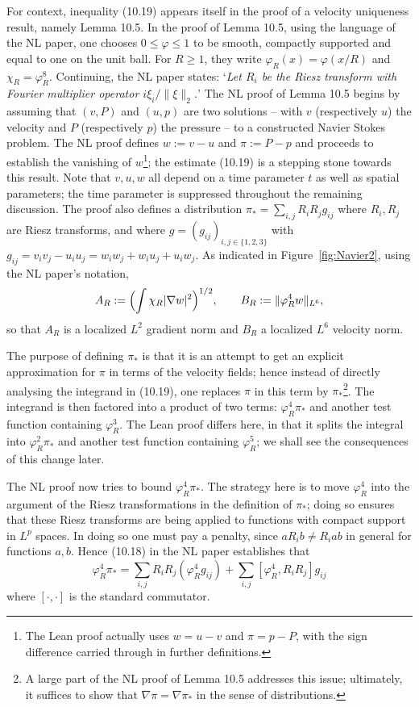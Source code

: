 \documentclass[10pt, a4paper, reqno]{amsart}
\numberwithin{equation}{section}
\renewcommand{\geq}{\geqslant}
\renewcommand{\leq}{\leqslant}
\theoremstyle{definition}
\theoremstyle{definition}
\begin{document}
For context, inequality (10.19) appears itself in the proof of a velocity uniqueness result, namely Lemma 10.5. 
In the proof of Lemma 10.5, using the language of 
the NL paper, one chooses $0 \leq \varphi \leq 1 $ to be smooth,
compactly supported and equal to one on the unit ball. For $R \geq 1$, they write $\varphi_R(x) = \varphi(x/R)$ and
$\chi_R = \varphi^8_R$. Continuing, the NL paper states:  `\emph{Let $R_i$ be the Riesz transform with Fourier multiplier operator $i\xi_i/\|\xi\|_2$.}' 
The NL proof of Lemma 10.5 begins by assuming that $(v,P)$ and $(u,p)$ are two solutions -- with $v$ (respectively $u$) the velocity and $P$ (respectively $p$) the pressure -- to a constructed Navier Stokes problem. The NL proof defines $w := v - u$ and $\pi := P-p$ and proceeds to establish the vanishing of $w$\footnote{The Lean proof actually uses $w = u-v$ and $\pi = p -P$, with the sign difference carried through in further definitions.}; the estimate (10.19) is a stepping stone towards this result. Note that $v,u,w$ all depend on a time parameter $t$ as well as spatial parameters; the time parameter is suppressed throughout the remaining discussion. The proof also defines a distribution $\pi_* = \sum_{i, j} R_i R_j g_{ij}$ where $R_i, R_j$ are Riesz transforms, and where $g = (g_{ij})_{i,j \in \{1,2,3\}}$ with $g_{ij} = v_iv_j - u_iu_j = w_iw_j + w_i u_j + u_i w_j$. 
As indicated
in Figure~\ref{fig:Navier2}, using the NL paper's notation,
\[
A_R:=\Bigl(\int\chi_R|\nabla w|^2\Bigr)^{1/2},
\qquad
B_R:=\|\varphi_R^{4}w\|_{L^6},
\]
so that $A_R$ is a localized $L^2$ gradient norm and $B_R$ a localized
$L^6$ velocity norm.


The purpose of defining $\pi_*$ is that it is an attempt to get an explicit approximation for $\pi$ in terms of the velocity fields; hence instead of directly analysing the integrand in (10.19), one replaces $\pi$ in this term by $\pi_*$\footnote{A large part of the NL proof of Lemma 10.5 addresses this issue; ultimately, it suffices to show that $\nabla \pi = \nabla \pi_*$ in the sense of distributions.}. The integrand is then factored into a product of two terms: $\varphi_{R}^4 \pi_*$ and another test function containing $\varphi_{R}^{3}$. The Lean proof differs here, in that it splits the integral into $\varphi_{R}^2 \pi_*$ and another test function containing $\varphi_R^5$; we shall see the consequences of this change later.

The NL proof now tries to bound $\varphi_R^4 \pi_*$. The strategy here is to move $\varphi_R^4$ into the argument of the Riesz transformations in the definition of $\pi_*$; doing so ensures that these Riesz transforms are being applied to functions with compact support in $L^p$ spaces. In doing so one must pay a penalty, since $a R_i b \neq R_i a b$ in general for functions $a,b$. Hence (10.18) in the NL paper establishes that
\begin{equation} \label{eq:NLSplitting}
	\varphi_R^4 \pi_* = \sum_{i, j} R_i R_j (\varphi_R^4 g_{ij}) + \sum_{i,j} [\varphi_R^4,R_i R_j] g_{ij}\end{equation}
where $[\cdot,\cdot]$ is the standard commutator. 
\end{document}
